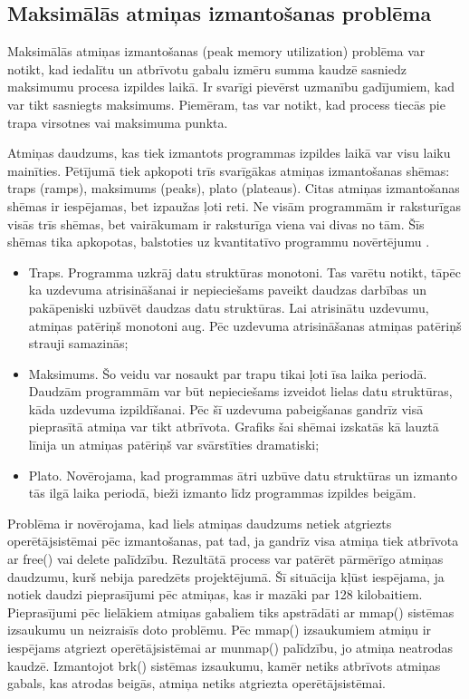 

\subsection{Maksimālās atmiņas izmantošanas problēma}
 \label{sec:peak_mem}
 Maksimālās atmiņas izmantošanas (peak memory utilization) problēma var notikt, kad iedalītu un atbrīvotu gabalu izmēru summa kaudzē sasniedz maksimumu procesa izpildes laikā.
Ir svarīgi pievērst uzmanību gadījumiem, kad var tikt sasniegts maksimums.
Piemēram, tas var notikt, kad process tiecās pie trapa virsotnes vai maksimuma punkta.

Atmiņas daudzums, kas tiek izmantots programmas izpildes laikā var visu laiku mainīties.
Pētījumā \cite{PWMS} tiek apkopoti trīs svarīgākas atmiņas izmantošanas shēmas: traps (ramps),  maksimums (peaks),  plato (plateaus).
Citas atmiņas izmantošanas shēmas ir iespējamas, bet izpaužas ļoti reti.
Ne visām programmām ir raksturīgas visās trīs shēmas, bet vairākumam ir raksturīga viena vai divas no tām.
Šīs shēmas tika apkopotas, balstoties uz kvantitatīvo programmu novērtējumu \cite{PWMS}. 
\begin{itemize}
\item Traps. Programma uzkrāj datu struktūras monotoni. 
Tas varētu notikt, tāpēc ka uzdevuma atrisināšanai ir nepieciešams paveikt daudzas darbības un pakāpeniski uzbūvēt daudzas  datu struktūras. 
Lai atrisinātu uzdevumu, atmiņas patēriņš monotoni aug. Pēc uzdevuma atrisināšanas atmiņas patēriņš strauji samazinās;
\item Maksimums. Šo veidu var nosaukt par trapu tikai ļoti īsa laika periodā.
Daudzām programmām var būt nepieciešams izveidot lielas datu struktūras, kāda uzdevuma izpildīšanai.
Pēc šī uzdevuma pabeigšanas gandrīz visā pieprasītā atmiņa var tikt atbrīvota.
Grafiks šai shēmai izskatās kā lauztā līnija un atmiņas patēriņš var svārstīties dramatiski;
\item Plato. Novērojama, kad programmas ātri uzbūve datu struktūras un izmanto tās ilgā laika periodā, bieži izmanto līdz programmas izpildes beigām.
\end{itemize}


Problēma ir novērojama, kad liels atmiņas daudzums netiek atgriezts operētājsistēmai pēc izmantošanas, pat tad, ja gandrīz visa atmiņa tiek atbrīvota ar free() vai delete palīdzību.
Rezultātā process var patērēt pārmērīgo atmiņas daudzumu, kurš nebija paredzēts projektējumā.
Šī situācija kļūst iespējama, ja notiek daudzi pieprasījumi pēc atmiņas, kas ir mazāki par 128 kilobaitiem.
Pieprasījumi pēc lielākiem atmiņas gabaliem tiks apstrādāti ar mmap() sistēmas izsaukumu un neizraisīs doto problēmu.
Pēc mmap() izsaukumiem atmiņu ir iespējams atgriezt operētājsistēmai ar munmap() palīdzību, jo atmiņa neatrodas kaudzē. 
Izmantojot brk() sistēmas izsaukumu, kamēr netiks atbrīvots atmiņas gabals, kas atrodas beigās, atmiņa netiks atgriezta operētājsistēmai.

